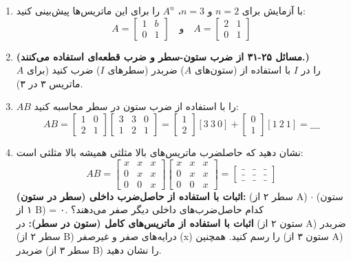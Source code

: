\documentclass[12pt, a4paper]{book}
\begin{document}
\begin{enumerate}
		\item با آزمایش برای $n=2$ و $n=3$، $A^n$ را برای این ماتریس‌ها پیش‌بینی کنید:
		\[ A = \begin{bmatrix} 1 & b \\ 0 & 1 \end{bmatrix} \quad \text{و} \quad A = \begin{bmatrix} 2 & 1 \\ 0 & 1 \end{bmatrix} \]
		
		\item \textbf{(مسائل ۲۵-۳۱ از ضرب ستون-سطر و ضرب قطعه‌ای استفاده می‌کنند.)}\\
		$A$ را در $I$ با استفاده از (ستون‌های $A$) ضربدر (سطرهای $I$) ضرب کنید (برای ماتریس ۳ در ۳).
		
		\item $AB$ را با استفاده از ضرب ستون در سطر محاسبه کنید:
		\[ AB = \begin{bmatrix} 1 & 0 \\ 2 & 1 \end{bmatrix} \begin{bmatrix} 3 & 3 & 0 \\ 1 & 2 & 1 \end{bmatrix} = \begin{bmatrix} 1 \\ 2 \end{bmatrix} [3 \ 3 \ 0] + \begin{bmatrix} 0 \\ 1 \end{bmatrix} [1 \ 2 \ 1] = \_\_\_ \]
		
		\item نشان دهید که حاصلضرب ماتریس‌های بالا مثلثی همیشه بالا مثلثی است:
		\[ AB = \begin{bmatrix} x & x & x \\ 0 & x & x \\ 0 & 0 & x \end{bmatrix} \begin{bmatrix} x & x & x \\ 0 & x & x \\ 0 & 0 & x \end{bmatrix} = \begin{bmatrix} \_ & \_ & \_ \\ \_ & \_ & \_ \\ \_ & \_ & \_ \end{bmatrix} \]
		\textbf{اثبات با استفاده از حاصل‌ضرب داخلی (سطر در ستون):} (سطر ۲ از A) $\cdot$ (ستون ۱ از B) = ۰. کدام حاصل‌ضرب‌های داخلی دیگر صفر می‌دهند؟ \\
		\textbf{اثبات با استفاده از ماتریس‌های کامل (ستون در سطر):} در (ستون ۲ از A) ضربدر (سطر ۲ از B) درایه‌های صفر و غیرصفر (x) را رسم کنید. همچنین (ستون ۳ از A) ضربدر (سطر ۳ از B) را نشان دهید.
		

\end{enumerate}
\end{document}
